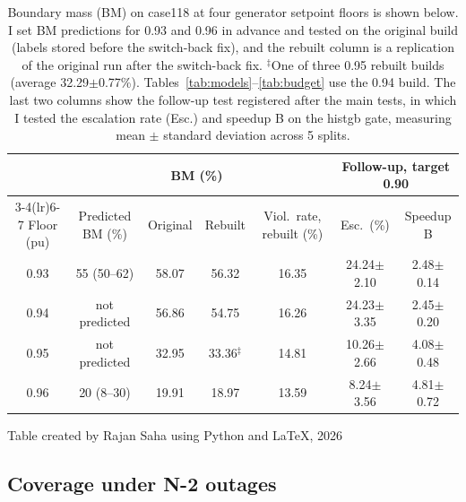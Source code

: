 \documentclass[12pt]{article}
\begin{document}
\begin{table}[htbp]
\centering
\caption{Boundary mass (BM) on case118 at four generator setpoint floors is shown below. I set BM predictions for 0.93 and 0.96 in advance and tested on the original build (labels stored before the switch-back fix), and the rebuilt column is a replication of the original run after the switch-back fix. $^{\ddagger}$One of three 0.95 rebuilt builds (average 32.29$\pm$0.77\%). Tables~\ref{tab:models}--\ref{tab:budget} use the 0.94 build. The last two columns show the follow-up test registered after the main tests, in which I tested the escalation rate (Esc.) and speedup B on the histgb gate, measuring mean $\pm$ standard deviation across 5 splits.}
\label{tab:floor}
\small
\setlength{\tabcolsep}{3pt}
\begin{tabular}{ccccccc}
\toprule
 & & \multicolumn{2}{c}{BM (\%)} & & \multicolumn{2}{c}{Follow-up, target 0.90} \\
\cmidrule(lr){3-4}\cmidrule(lr){6-7}
Floor (pu) & Predicted BM (\%) & Original & Rebuilt & Viol.\ rate, rebuilt (\%) & Esc.\ (\%) & Speedup B \\
\midrule
0.93 & 55 (50--62) & 58.07 & 56.32 & 16.35 & 24.24$\pm$2.10 & 2.48$\pm$0.14 \\
0.94 & not predicted   & 56.86 & 54.75 & 16.26 & 24.23$\pm$3.35 & 2.45$\pm$0.20 \\
0.95 & not predicted   & 32.95 & 33.36$^{\ddagger}$ & 14.81 & 10.26$\pm$2.66 & 4.08$\pm$0.48 \\
0.96 & 20 (8--30)  & 19.91 & 18.97 & 13.59 & 8.24$\pm$3.56 & 4.81$\pm$0.72 \\
\bottomrule
\end{tabular}

\vspace*{1ex}
{\small Table created by Rajan Saha using Python and \LaTeX, 2026}
\end{table}


\subsection{Coverage under N-2 outages}
\end{document}
